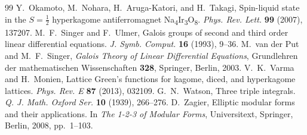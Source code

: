\documentclass[11pt]{article}
\theoremstyle{plain}
\theoremstyle{remark}
\begin{document}
\begin{thebibliography}{99}
 Y.~Okamoto, M.~Nohara, H.~Aruga-Katori, and H.~Takagi, Spin-liquid state in the $S=\frac12$ hyperkagome antiferromagnet Na\textsubscript{4}Ir\textsubscript{3}O\textsubscript{8}. \textit{Phys. Rev. Lett.} \textbf{99} (2007), 137207.
 M.~F.~Singer and F.~Ulmer, Galois groups of second and third order linear differential equations. \textit{J. Symb. Comput.} \textbf{16} (1993), 9--36.
 M.~van der Put and M.~F.~Singer, \textit{Galois Theory of Linear Differential Equations}, Grundlehren der mathematischen Wissenschaften \textbf{328}, Springer, Berlin, 2003.
 V.~K.~Varma and H.~Monien, Lattice Green's functions for kagome, diced, and hyperkagome lattices. \textit{Phys. Rev. E} \textbf{87} (2013), 032109.
 G.~N.~Watson, Three triple integrals. \textit{Q. J. Math. Oxford Ser.} \textbf{10} (1939), 266--276.
 D.~Zagier, Elliptic modular forms and their applications. In \textit{The 1-2-3 of Modular Forms}, Universitext, Springer, Berlin, 2008, pp.~1--103.
\end{thebibliography}
\end{document}
